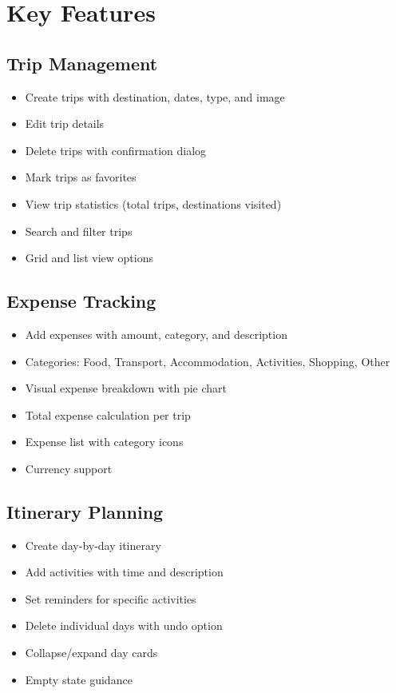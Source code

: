 \documentclass[12pt,a4paper]{article}
\begin{document}
\newpage

\section{Key Features}

\subsection{Trip Management}
\begin{itemize}
    \item Create trips with destination, dates, type, and image
    \item Edit trip details
    \item Delete trips with confirmation dialog
    \item Mark trips as favorites
    \item View trip statistics (total trips, destinations visited)
    \item Search and filter trips
    \item Grid and list view options
\end{itemize}

\subsection{Expense Tracking}
\begin{itemize}
    \item Add expenses with amount, category, and description
    \item Categories: Food, Transport, Accommodation, Activities, Shopping, Other
    \item Visual expense breakdown with pie chart
    \item Total expense calculation per trip
    \item Expense list with category icons
    \item Currency support
\end{itemize}

\subsection{Itinerary Planning}
\begin{itemize}
    \item Create day-by-day itinerary
    \item Add activities with time and description
    \item Set reminders for specific activities
    \item Delete individual days with undo option
    \item Collapse/expand day cards
    \item Empty state guidance
\end{itemize}
\end{document}
